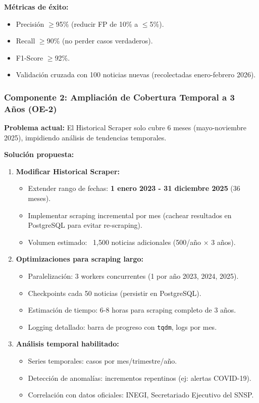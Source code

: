 \textbf{Métricas de éxito:}
\begin{itemize}
    \item Precisión $\geq$95\% (reducir FP de 10\% a $\leq$5\%).
    \item Recall $\geq$90\% (no perder casos verdaderos).
    \item F1-Score $\geq$92\%.
    \item Validación cruzada con 100 noticias nuevas (recolectadas enero-febrero 2026).
\end{itemize}

\subsubsection{Componente 2: Ampliación de Cobertura Temporal a 3 Años (OE-2)}
\label{subsubsec:historical_3years}

\textbf{Problema actual:} El Historical Scraper solo cubre 6 meses (mayo-noviembre 2025), impidiendo análisis de tendencias temporales.

\textbf{Solución propuesta:}

\begin{enumerate}
    \item \textbf{Modificar Historical Scraper:}
    \begin{itemize}
        \item Extender rango de fechas: \textbf{1 enero 2023 - 31 diciembre 2025} (36 meses).
        \item Implementar scraping incremental por mes (cachear resultados en PostgreSQL para evitar re-scraping).
        \item Volumen estimado: ~1,500 noticias adicionales (500/año × 3 años).
    \end{itemize}
    
    \item \textbf{Optimizaciones para scraping largo:}
    \begin{itemize}
        \item Paralelización: 3 workers concurrentes (1 por año 2023, 2024, 2025).
        \item Checkpoints cada 50 noticias (persistir en PostgreSQL).
        \item Estimación de tiempo: 6-8 horas para scraping completo de 3 años.
        \item Logging detallado: barra de progreso con \texttt{tqdm}, logs por mes.
    \end{itemize}
    
    \item \textbf{Análisis temporal habilitado:}
    \begin{itemize}
        \item Series temporales: casos por mes/trimestre/año.
        \item Detección de anomalías: incrementos repentinos (ej: alertas COVID-19).
        \item Correlación con datos oficiales: INEGI, Secretariado Ejecutivo del SNSP.
    \end{itemize}
\end{enumerate}

